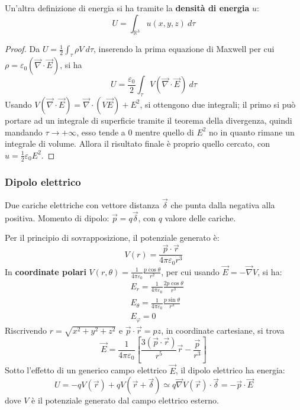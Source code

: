 \documentclass[a4paper]{scrartcl}
\numberwithin{equation}{subsection}
\theoremstyle{style1}
\newenvironment{boxenv}[1][]{
    \begin{eqbox}[#1]
    }{
   \end{eqbox}
}
\begin{document}
Un'altra definizione di energia si ha tramite la \textbf{densit\`a di energia} $u$:
\begin{equation}
	U = \int_{\mathbb{R}^3} u(x,y,z) \ d\tau  
\end{equation}
\begin{boxenv}[]
\begin{proof}
	Da $U = \frac{1}{2}\int_{\tau } \rho V \ d\tau $, inserendo la prima equazione di Maxwell per cui $\rho  = \varepsilon _0 (\vec{\nabla }\cdot \vec{E})$, si ha 
	\begin{equation}
		U = \frac{\varepsilon _0}{2} \int_{\tau } V (\vec{\nabla }\cdot \vec{E}) \ d\tau 
	\end{equation}
	Usando $V(\vec{\nabla }\cdot \vec{E}) = \vec{\nabla }\cdot (V\vec{E})+E^2$, si ottengono due integrali; il primo si pu\`o portare ad un integrale di superficie tramite il teorema della divergenza, quindi mandando $\tau \to+\infty$, esso tende a $0$ mentre quello di $E^2$ no in quanto rimane un integrale di volume. Allora il risultato finale \`e proprio quello cercato, con $u = \frac{1}{2}\varepsilon _0 E^2$.
\end{proof}
\end{boxenv}



\subsubsection{Dipolo elettrico}
Due cariche elettriche con vettore distanza $\vec{\delta }$ che punta dalla negativa alla positiva. Momento di dipolo: $\vec{p} = q \vec{\delta }$, con $q$ valore delle cariche.

Per il principio di sovrapposizione, il potenziale generato \`e:
 \begin{equation}
 	V(r) = \frac{\vec{p}\cdot \vec{r}}{4 \pi \varepsilon _0 r^3}
 \end{equation}
In \textbf{coordinate polari} $V(r,\theta ) = \frac{1}{4\pi \varepsilon _0}\frac{p \cos \theta }{r^2}$, per cui usando $\vec{E} = - \vec{\nabla }V$, si ha:
\begin{equation}
	\begin{split}
		&E_r = \frac{1}{4\pi \varepsilon _0} \frac{2 p \cos \theta }{r^3}\\
		&E_\theta  = \frac{1}{4 \pi \varepsilon _0} \frac{p \sin \theta  }{r^3}\\
		& E_\varphi = 0
	\end{split}
\end{equation}
Riscrivendo $r = \sqrt{x^2 + y^2 + z^2} $ e $\vec{p}\cdot \vec{r}= p z$, in coordinate cartesiane, si trova
\begin{equation}
	\vec{E} = \frac{1}{4\pi \varepsilon _0 }\left[ \frac{3(\vec{p}\cdot \vec{r})}{r^5}\vec{r} - \frac{\vec{p}}{r^3} \right] 
\end{equation}
Sotto l'effetto di un generico campo elettrico $\vec{E}$, il dipolo elettrico ha energia:
\begin{equation}
	U = -qV(\vec{r}) + q V(\vec{r}+\vec{\delta }) \simeq q \vec{\nabla }V (\vec{r}) \cdot \vec{\delta } =  -\vec{p}\cdot \vec{E}
\end{equation}
dove $V$ \`e il potenziale generato dal campo elettrico esterno.
\end{document}
